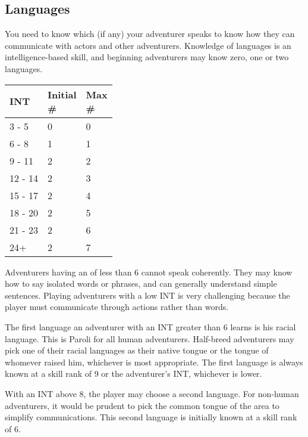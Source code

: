 \begin{multicols*}{2}
\section{Languages}
You need to know which  (if any) your adventurer speaks to know how they can communicate with actors and other adventurers. Knowledge of languages is an intelligence-based skill, and beginning adventurers may know zero, one or two languages.
\label{create-language}
\begin{normbox}
\begin{tabular}{l l l}
\small
INT & \makecell{Initial\\\#} & \makecell{Max\\\#}\\
\midrule
3 - 5 & 0 & 0\\
6 - 8 & 1 & 1\\
9 - 11 & 2 & 2\\
12 - 14 & 2 & 3\\
15 - 17 & 2 & 4\\
18 - 20 & 2 & 5\\
21 - 23 & 2 & 6\\
24+ & 2 & 7\\
\end{tabular}
\end{normbox}

Adventurers having an \INT of less than 6 cannot speak coherently. They may know how to say isolated words or phrases, and can generally understand simple sentences. Playing adventurers with a low INT is very challenging because the player must communicate through actions rather than words.

The first language an adventurer with an INT greater than 6 learns is his racial language. This is Paroli for all human adventurers. Half-breed adventurers may pick one of their racial languages as their native tongue or the tongue of whomever raised him, whichever is most appropriate. The first language is always known at a skill rank of 9 or the adventurer's INT, whichever is lower.

With an INT above 8, the player may choose a second language. For non-human adventurers, it would be prudent to pick the common tongue of the area to simplify communications. This second language is initially known at a skill rank of 6.


\end{multicols*}
